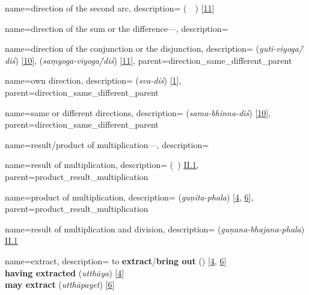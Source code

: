 {
        name={direction of the second arc},
        description={ (\jahat\idafaconsonant\ \qaws\idafaconsonant\ \duvum) [\hyperlink{PEpass11}{11}]}
}

{
        name={direction of the sum or the difference---},
        description={\phantom{x}\nopagebreak}
}

{
        name={direction of the conjunction or the disjunction},
        description={ (\textit{yuti-viyoga\=/diś}) [\hyperlink{SEpass10}{10}],  (\textit{saṃyoga-viyoga\=/diś}) [\hyperlink{SEpass11}{11}]},
        parent={direction_same_different_parent}
}

{
        name={own direction},
        description={ (\textit{sva-diś}) [\hyperlink{SEpass1}{1}]},
        parent={direction_same_different_parent}
}

{
        name={same or different directions},
        description={ (\textit{sama-bhinna-diś}) [\hyperlink{SEpass10}{10}]},
        parent={direction_same_different_parent}
}

{
        name={result/product of multiplication---},
        description={\phantom{x}\nopagebreak}
}

{
        name={result of multiplication},
        description={ (\hasil\idafaconsonant\ \darb) \hyperlink{Pii1}{II.1}},
        parent={product_result_multiplication}
} 

{
        name={product of multiplication},
        description={ (\textit{guṇita-phala}) [\hyperlink{SEpass4}{4}, \hyperlink{SEpass6}{6}]},
        parent={product_result_multiplication}
}
       

{
        name={result of multiplication and division},
        description={  (\textit{guṇana-bhajana-phala}) \hyperlink{Sii1}{II.1}}
}

{
        name={extract},
        description={\newline 
        to \textbf{extract}/\textbf{bring out}\quad {} (\darardan) [\hyperlink{PEpass4}{4}, \hyperlink{PEpass6}{6}]\\[.2\baselineskip]
        \textbf{having extracted}\quad {} (\textit{utthāya}) [\hyperlink{SEpass4}{4}]\\[0.2\baselineskip]
        \textbf{may extract}\quad {} (\textit{utthāpayet}) [\hyperlink{SEpass6}{6}]}
}


